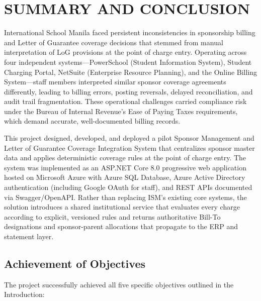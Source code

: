 
\section{SUMMARY AND CONCLUSION}

International School Manila faced persistent inconsistencies in sponsorship billing and Letter of Guarantee coverage decisions that stemmed from manual interpretation of LoG provisions at the point of charge entry. Operating across four independent systems—PowerSchool (Student Information System), Student Charging Portal, NetSuite (Enterprise Resource Planning), and the Online Billing System—staff members interpreted similar sponsor coverage agreements differently, leading to billing errors, posting reversals, delayed reconciliation, and audit trail fragmentation. These operational challenges carried compliance risk under the Bureau of Internal Revenue's Ease of Paying Taxes requirements, which demand accurate, well-documented billing records.

This project designed, developed, and deployed a pilot Sponsor Management and Letter of Guarantee Coverage Integration System that centralizes sponsor master data and applies deterministic coverage rules at the point of charge entry. The system was implemented as an ASP.NET Core 8.0 progressive web application hosted on Microsoft Azure with Azure SQL Database, Azure Active Directory authentication (including Google OAuth for staff), and REST APIs documented via Swagger/OpenAPI. Rather than replacing ISM's existing core systems, the solution introduces a shared institutional service that evaluates every charge according to explicit, versioned rules and returns authoritative Bill-To designations and sponsor-parent allocations that propagate to the ERP and statement layer.

\subsection{Achievement of Objectives}

The project successfully achieved all five specific objectives outlined in the Introduction:

